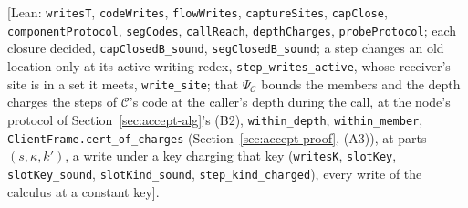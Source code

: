 \documentclass[10pt,a4paper]{article}
\theoremstyle{definition}
\theoremstyle{remark}
\newcommand{\lean}[1]{\texttt{\small #1}}
\newcommand{\status}[1]{\textsf{\small[#1]}}
\newcommand{\cC}{\mathcal{C}}
\begin{document}
\status{Lean: \lean{writesT}, \lean{codeWrites}, \lean{flowWrites}, \lean{captureSites}, \lean{capClose}, \lean{componentProtocol}, \lean{segCodes}, \lean{callReach}, \lean{depthCharges}, \lean{probeProtocol}; each closure decided, \lean{capClosedB\_sound}, \lean{segClosedB\_sound}; a step changes an old location only at its active writing redex, \lean{step\_writes\_active}, whose receiver's site is in a set it meets, \lean{write\_site}; that $\Psi_\cC$ bounds the members and the depth charges the steps of $\cC$'s code at the caller's depth during the call, at the node's protocol of Section~\ref{sec:accept-alg}'s (B2), \lean{within\_depth}, \lean{within\_member}, \lean{ClientFrame.cert\_of\_charges} (Section~\ref{sec:accept-proof}, (A3)), at parts $(s,\kappa,k')$, a write under a key charging that key (\lean{writesK}, \lean{slotKey}, \lean{slotKey\_sound}, \lean{slotKind\_sound}, \lean{step\_kind\_charged}), every write of the calculus at a constant key}.
\end{document}
